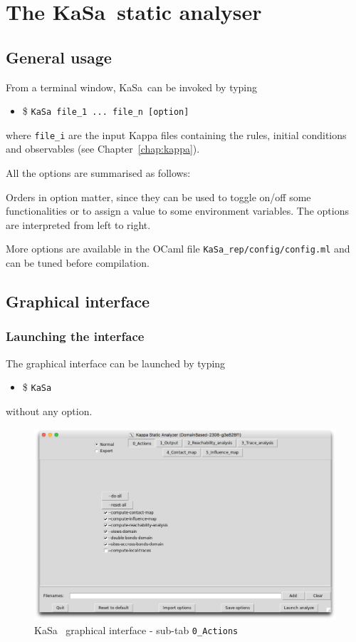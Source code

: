 \documentclass[11pt]{book}
\def\KaSa{\textsf{KaSa}}
\def\ttt#1{\texttt{#1}}
\def\ITE#1{\begin{itemize}#1\end{itemize}}
\begin{document}
\chapter{The \KaSa~static analyser}

\section{General usage}

From a terminal window, \KaSa~can be invoked by typing
\ITE{
\item[\$] \ttt{KaSa file\_1 ... file\_n  [option]}
}
where \ttt{file\_i} are the input Kappa files containing the rules, initial conditions and observables (see Chapter~\ref{chap:kappa}).

All the options are summarised as follows:


Orders in option matter, since they can be used to toggle on/off some functionalities or to assign a value to some environment variables.
The options are interpreted from left to right.

More options are available in the OCaml file \texttt{KaSa\_rep/config/config.ml} and can be tuned before compilation.

\section{Graphical interface}

\subsection{Launching the interface}

The graphical interface can be launched by typing
\ITE{\item[\$] \ttt{KaSa}}

without any option.

\begin{figure}[htbp]
\centering
\includegraphics[width=12cm,bb=0 0 1904 1208]{img/kasa_0.png}
\caption{\KaSa~ graphical interface - sub-tab \texttt{0\_Actions}}
\label{fig:kasa:0}
\end{figure}
\end{document}
